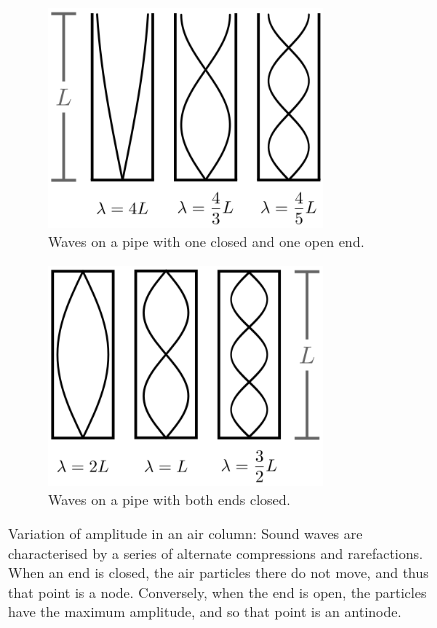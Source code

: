\begin{figure}[!htb]
    \centering
    \begin{subfigure}[b]{0.5\textwidth}
        \centering
\includegraphics[width=0.8\textwidth]{figs/wavesInAHalfOpenPipe.png}
                \caption{Waves on a pipe with one closed and one open end.}
                \label{fig:wavesInAHalfOpenPipe}
        \end{subfigure}\hfill
        \begin{subfigure}[b]{0.5\textwidth}
        \centering
                \includegraphics[width=0.8\textwidth]{figs/wavesInAClosedPipe.png}
                \caption{Waves on a pipe with both ends closed.}
                \label{fig:wavesInAClosedPipe}
        \end{subfigure}
    \caption{Variation of amplitude in an air column: Sound waves are characterised by a series of alternate compressions and rarefactions. When an end is closed, the air particles there do not move, and thus that point is a node. Conversely, when the end is open, the particles have the maximum amplitude, and so that point is an antinode.}
    \label{fig:wavesInAPipe}
\end{figure}


